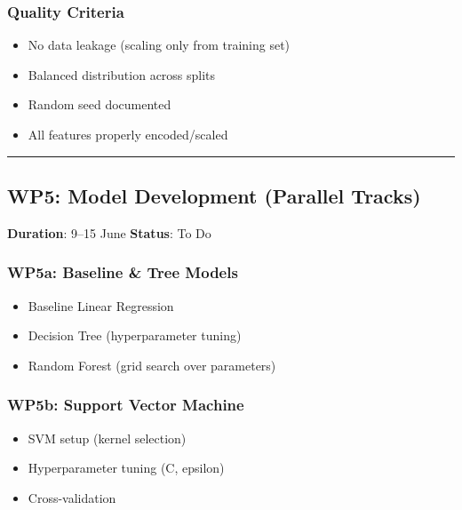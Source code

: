 \documentclass[
  english,
  letterpaper,
  DIV=11,
  numbers=noendperiod]{scrreprt}
\providecommand{\tightlist}{%
  \setlength{\itemsep}{0pt}\setlength{\parskip}{0pt}}
\begin{document}
\subsubsection{Quality Criteria}\label{quality-criteria-3}

\begin{itemize}
\tightlist
\item[$\square$]
  No data leakage (scaling only from training set)
\item[$\square$]
  Balanced distribution across splits
\item[$\square$]
  Random seed documented
\item[$\square$]
  All features properly encoded/scaled
\end{itemize}

\begin{center}\rule{0.5\linewidth}{0.5pt}\end{center}

\subsection{WP5: Model Development (Parallel
Tracks)}\label{wp5-model-development-parallel-tracks}

\textbf{Duration}: 9--15 June \textbar{} \textbf{Status}: To Do

\subsubsection{WP5a: Baseline \& Tree
Models}\label{wp5a-baseline-tree-models}

\begin{itemize}
\tightlist
\item
  Baseline Linear Regression
\item
  Decision Tree (hyperparameter tuning)
\item
  Random Forest (grid search over parameters)
\end{itemize}

\subsubsection{WP5b: Support Vector
Machine}\label{wp5b-support-vector-machine}

\begin{itemize}
\tightlist
\item
  SVM setup (kernel selection)
\item
  Hyperparameter tuning (C, epsilon)
\item
  Cross-validation
\end{itemize}
\end{document}
